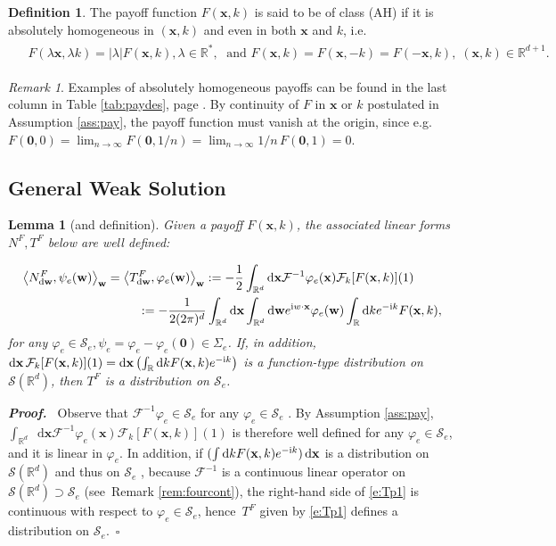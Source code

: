 \documentclass[11pt,A4,twoside]{article}
\numberwithin{equation}{section}
\renewcommand{\b}[1]{{\color{blue}#1}}
\renewcommand{\vec}{\mathbf}
\newcommand{\F}{\mathcal{F}}
\newcommand{\Fi}{\mathcal{F}^{-1}}
\renewcommand*\d{\mathop{}\!\mathrm{d}}
\newcommand{\norm}[1]{\left|#1 \right|}
\newcommand{\inner}[1]{\left\langle#1 \right\rangle}
\newcommand{\x}{\mathbf{x}}
\newcommand{\w}{\mathbf{w}}
\newcommand{\R}{\mathbbm{R}}
\renewcommand{\S}{\mathcal{S}}
\newcommand{\intRd}{\int_{\R^d}}
\newcommand{\intRs}{\int_{\R }}
\newcommand{\intR}{\int_{\R}}
\def\qqq{\;\;\;\;\;\;\;\;\;}
\def\bel{\begin{eqnarray*}\begin{aligned}}
\def\eel{\end{aligned}\end{eqnarray*}}
\newcommand{\beqa}{\begin{eqnarray}}
\newcommand{\eeqa}{\end{eqnarray}}
\def\bal{\begin{aligned}}
\def\eal{\end{aligned}}
\def\bll#1{
\beqa\label{#1}\bal
}\def\lel{\eal\eeqa}
\newcommand{\beql}[1]{\bll{#1}}
\newcommand{\eeql}{\lel}
\newtheorem{lemma}[theorem]{Lemma}
\theoremstyle{definition}
\newtheorem{definition}{Definition}[section]
\theoremstyle{remark}
\newtheorem{remark}{Remark}[section]
\def\sp{,\;}
\def\AHl{{\rm AHa}\xspace}\def\AHl{{\rm (AH)}\xspace}
\def\R{\mathbb{R}}
\def\varphie{\varphi_e}
\def\finenv{\rule{4pt}{6pt}} \def\finenv{}
\def\finproof {$\Box$ \vskip 5 pt }\def\finproof{\rule{4pt}{6pt}}\def\finproof{\ensuremath{\square}}
\def\proof{\noindent \emph{\textbf{Proof.} $\, $}}
\def\thermi{{\rm i}}%
\begin{document}
\begin{definition}\label{d:ahl}
The payoff function $F(\vec x, k)$  is said to be of class \AHl if it is absolutely homogeneous in $(\x, k )$ and even in both  $\x$ and $k$, i.e.
\bel& F(\lambda\x,\lambda k) = \norm{\lambda} F(\x, k), \lambda\in \R^*\sp\mbox{\ and\ \ }F(\x, k ) = F(\x, -k ) = F(-\x, k )\sp (\x, k )\in\R^{d+1}.\ \finenv\eel
\end{definition}
\begin{remark}
    Examples of absolutely homogeneous payoffs can be found in the last column in Table \ref{tab:paydes}, page \pageref{tab:paydes}.  By continuity of $F$  in $\x$ or $k$ postulated in Assumption \ref{ass:pay}, the payoff function  must vanish at the origin, since e.g.\ $F(\vec 0, 0) = \lim_{n \to \infty }F(\vec 0, 1/n)=\lim_{n \to \infty } 1/n  \, F(\vec 0, 1)=0$.
\end{remark}
 
\subsection{General Weak Solution}
\begin{lemma}[and definition]     \label{l:abs-homogeneous}
Given a payoff $F(\x,k)$, the associated linear forms $N^F, T^F$ below are well defined:
\beql{e:Tp1}
   \inner{N^F_{\d \w},\psi_e(\w)}_{\w}
   & =
    \inner{T^F_{\d \w}, \varphie (\w) }_{\w}:=  -\frac{1}{2}\intRd  \d \x\Fi \varphie (\x) \F_k[ F(\x,k) ](1)
    \\
     &\qqq := -\frac{1}{2(2\pi)^d}\intRd  \d \x \intRd \d\w e^{\thermi w\cdot\x} \varphie (\w)  \intRs \d k e^{-\thermi k}  F(\x,  k),
\eeql
for any $\varphie  \in \S_e , \psi_e=  \varphie-  \varphie(\mathbf{0}) \in\Sigma_e$.  If, in addition, 
$ \d\x\,\F_k[F(\x,k)](1) = \d\x \left(\intR \d k F(\x,k)e^{-\thermi k}\right) $ is a function-type distribution on $ \S(\R^d)$,
then $T^F$ is a distribution on $\S_e$. 
\end{lemma} 
 \proof 
 Observe that $\Fi\varphie\in\S_e$ for any $\varphie\in\S_e$ \citep[Theorem 3.3 and 4.1]{milton1974fourier}.  By Assumption \ref{ass:pay}, $\intRd  \d \x\Fi \varphie (\x) \F_k[ F(\x,k) ](1)$ is therefore well defined for any $\varphie\in\S_e$, and it is linear in $\varphie$. 
In addition, if $ (\int \d k  F(\x,  k) e^{-\thermi k})\d\x$ is a distribution on $\S(\R^d)$ and thus on $\S_e$ \citep[Theorem 4.4]{milton1974fourier}, because $\Fi$ is a continuous linear operator on $\S(\R^d) \supset \S_e$ (see~Remark \ref{rem:fourcont}), the right-hand side of \eqref{e:Tp1} is  continuous with respect to $\varphie\in\S_e$, hence~$T^F$ given by \eqref{e:Tp1} defines a distribution  on $\S_e$.\ \finproof 
 
\end{document}
